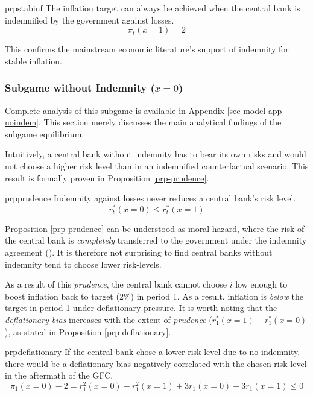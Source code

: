 \documentclass[
  a4paper,
  abstract=true]{scrartcl}
\theoremstyle{definition}
\begin{document}
\begin{restatable}{prp}{stabinf}
\label{prp-stabinf}
The inflation target can always be achieved when the central bank is indemnified by the government against losses.
$$
\pi_t(x=1)=2
$$
\end{restatable}

This confirms the mainstream economic literature's support of indemnity
for stable inflation.

\subsubsection{\texorpdfstring{Subgame without Indemnity
(\(x=0\))}{Subgame without Indemnity (x=0)}}\label{subgame-without-indemnity-x0}

Complete analysis of this subgame is available in Appendix
\ref{sec-model-app-noindem}. This section merely discusses the main
analytical findings of the subgame equilibrium.

Intuitively, a central bank without indemnity has to bear its own risks
and would not choose a higher risk level than in an indemnified
counterfactual scenario. This result is formally proven in Proposition
\ref{prp-prudence}.

\begin{restatable}{prp}{prudence}
\label{prp-prudence}
Indemnity against losses never reduces a central bank's risk level.
$$
r^*_t(x=0)\leq r^*_t(x=1)
$$
\end{restatable}

Proposition \ref{prp-prudence} can be understood as moral hazard, where
the risk of the central bank is \emph{completely} transferred to the
government under the indemnity agreement
(). It is therefore not
surprising to find central banks without indemnity tend to choose lower
risk-levels.

As a result of this \emph{prudence}, the central bank cannot choose
\(i\) low enough to boost inflation back to target (2\%) in period 1. As
a result. inflation is \emph{below} the target in period 1 under
deflationary pressure. It is worth noting that the \emph{deflationary
bias} increases with the extent of \emph{prudence}
(\(r^*_1(x=1)-r_1^*(x=0)\)), as stated in Proposition
\ref{prp-deflationary}.

\begin{restatable}{prp}{deflationary}
\label{prp-deflationary}
If the central bank chose a lower risk level due to no indemnity, there would be a deflationary bias negatively correlated with the chosen risk level in the aftermath of the GFC.
$$
\pi_1(x=0)-2=r_1^{2}(x=0)-r_1^{2}(x=1)+3r_1(x=0)-3r_1(x=1)\leq0
$$
\end{restatable}
\end{document}
